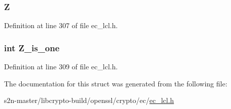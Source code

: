 \subsubsection[{\texorpdfstring{Z}{Z}}]{ Z}\hypertarget{structec__point__st_a074275f81cf5e10e84f6229665e1ec80}{}\label{structec__point__st_a074275f81cf5e10e84f6229665e1ec80}


Definition at line 307 of file ec\+\_\+lcl.\+h.

\subsubsection[{\texorpdfstring{Z\+\_\+is\+\_\+one}{Z_is_one}}]{\setlength{\rightskip}{0pt plus 5cm}int Z\+\_\+is\+\_\+one}\hypertarget{structec__point__st_ac97ce99b8fe8ae0231dae8db059308ce}{}\label{structec__point__st_ac97ce99b8fe8ae0231dae8db059308ce}


Definition at line 309 of file ec\+\_\+lcl.\+h.



The documentation for this struct was generated from the following file\+:\begin{DoxyCompactItemize}
\item 
s2n-\/master/libcrypto-\/build/openssl/crypto/ec/\hyperlink{ec__lcl_8h}{ec\+\_\+lcl.\+h}\end{DoxyCompactItemize}
